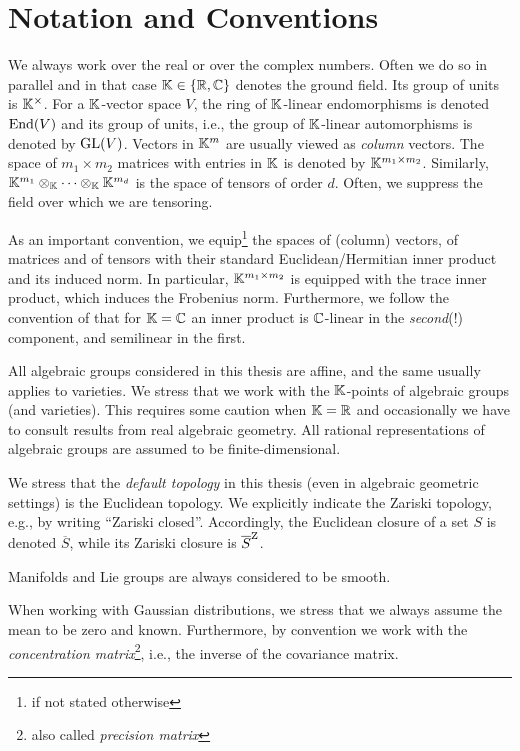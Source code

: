 \section*{Notation and Conventions}


We always work over the real or over the complex numbers. Often we do so in parallel and in that case $\mathbb K \in \{\mathbb R, \mathbb C\}$ denotes the ground field. Its group of units is $\mathbb K^\times$.
For a $\mathbb K$-vector space $V$, the ring of $\mathbb K$-linear endomorphisms is denoted $\operatorname{End}(V)$ and its group of units, i.e., the group of $\mathbb K$-linear automorphisms is denoted by $\operatorname{GL}(V)$.
Vectors in $\mathbb K^m$ are usually viewed as \emph{column} vectors. The space of $m_1 \times m_2$ matrices with entries in $\mathbb K$ is denoted by $\mathbb K^{m_1 \times m_2}$. Similarly, $\mathbb K^{m_1} \otimes_\mathbb K \cdots \otimes_\mathbb K \mathbb K^{m_d}$ is the space of tensors of order $d$. Often, we suppress the field over which we are tensoring.

As an important convention, we equip\footnote{ if not stated otherwise} the spaces of (column) vectors, of matrices and of tensors with their standard Euclidean/Hermitian inner product and its induced norm. In particular, $\mathbb K^{m_1 \times m_2}$ is equipped with the trace inner product, which induces the Frobenius norm. Furthermore, we follow the convention of \cite{GradflowArXiv} that for $\mathbb K = \mathbb C$ an inner product is $\mathbb C$-linear in the \emph{second}(!) component, and semilinear in the first.

All algebraic groups considered in this thesis are affine, and the same usually applies to varieties. We stress that we work with the $\mathbb K$-points of algebraic groups (and varieties). This requires some caution when $\mathbb K = \mathbb R$ and occasionally we have to consult results from real algebraic geometry. All rational representations of algebraic groups are assumed to be finite-dimensional.

We stress that the \emph{default topology} in this thesis (even in algebraic geometric settings) is the Euclidean topology. We explicitly indicate the Zariski topology, e.g., by writing ``Zariski closed''. Accordingly, the Euclidean closure of a set $S$ is denoted $\overline{S}$, while its Zariski closure is $\overline{S}^{\operatorname{Z}}$.

Manifolds and Lie groups are always considered to be smooth.

When working with Gaussian distributions, we stress that we always assume the mean to be zero and known. Furthermore, by convention we work with the \emph{concentration matrix}\footnote{also called \emph{precision matrix}}, i.e., the inverse of the covariance matrix.

